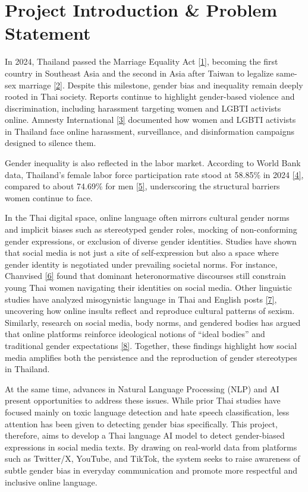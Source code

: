 \documentclass[12pt,oneside,openright,a4paper]{cpe-english-project}
\begin{document}
\section{Project Introduction \& Problem Statement}

In 2024, Thailand passed the Marriage Equality Act \hyperlink{bib:ref1}{[1]}, becoming the first country in Southeast Asia and the second in Asia after Taiwan to legalize same-sex marriage \hyperlink{bib:ref2}{[2]}. Despite this milestone, gender bias and inequality remain deeply rooted in Thai society. Reports continue to highlight gender-based violence and discrimination, including harassment targeting women and LGBTI activists online. Amnesty International \hyperlink{bib:ref3}{[3]} documented how women and LGBTI activists in Thailand face online harassment, surveillance, and disinformation campaigns designed to silence them.

Gender inequality is also reflected in the labor market. According to World Bank data, Thailand's female labor force participation rate stood at 58.85\% in 2024 \hyperlink{bib:ref4}{[4]}, compared to about 74.69\% for men \hyperlink{bib:ref5}{[5]}, underscoring the structural barriers women continue to face.

In the Thai digital space, online language often mirrors cultural gender norms and implicit biases such as stereotyped gender roles, mocking of non-conforming gender expressions, or exclusion of diverse gender identities. Studies have shown that social media is not just a site of self-expression but also a space where gender identity is negotiated under prevailing societal norms. For instance, Chanvised \hyperlink{bib:ref6}{[6]} found that dominant heteronormative discourses still constrain young Thai women navigating their identities on social media. Other linguistic studies have analyzed misogynistic language in Thai and English posts \hyperlink{bib:ref7}{[7]}, uncovering how online insults reflect and reproduce cultural patterns of sexism. Similarly, research on social media, body norms, and gendered bodies has argued that online platforms reinforce ideological notions of “ideal bodies” and traditional gender expectations \hyperlink{bib:ref8}{[8]}. Together, these findings highlight how social media amplifies both the persistence and the reproduction of gender stereotypes in Thailand.

At the same time, advances in Natural Language Processing (NLP) and AI present opportunities to address these issues. While prior Thai studies have focused mainly on toxic language detection and hate speech classification, less attention has been given to detecting gender bias specifically. This project, therefore, aims to develop a Thai language AI model to detect gender-biased expressions in social media texts. By drawing on real-world data from platforms such as Twitter/X, YouTube, and TikTok, the system seeks to raise awareness of subtle gender bias in everyday communication and promote more respectful and inclusive online language.
\end{document}
